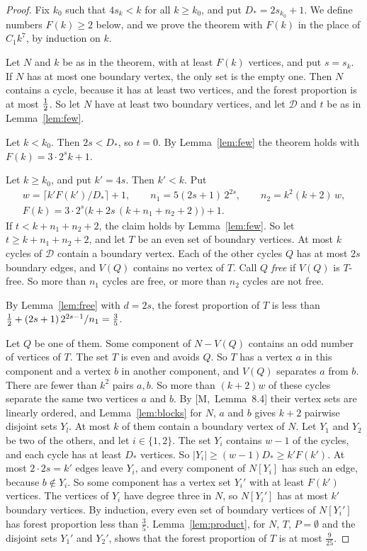 \documentclass[11pt]{article}
\newcommand{\M}[1]{[M,~#1]}
\begin{document}
\begin{proof}
Fix $k_0$ such that $4s_k<k$ for all $k\ge k_0$, and put $D_*=2s_{k_0}+1$. We define numbers
$F(k)\ge2$ below, and we prove the theorem with $F(k)$ in the place of $C_1k^{7}$, by induction
on $k$.

Let $N$ and $k$ be as in the theorem, with at least $F(k)$ vertices, and put $s=s_k$. If $N$ has
at most one boundary vertex, the only set is the empty one. Then $N$ contains a cycle, because it
has at least two vertices, and the forest proportion is at most $\tfrac12$. So let $N$ have at least
two boundary vertices, and let $\mathcal D$ and $t$ be as in Lemma~\ref{lem:few}.

 Let $k<k_0$. Then $2s<D_*$, so $t=0$. By Lemma~\ref{lem:few} the theorem
holds with $F(k)=3\cdot2^{s}k+1$.

 Let $k\ge k_0$, and put $k'=4s$. Then $k'<k$. Put
\begin{gather*}
  w=\lceil k'F(k')/D_*\rceil+1,\qquad n_1=5(2s+1)\,2^{2s},\qquad n_2=k^{2}(k+2)\,w,\\
  F(k)=3\cdot2^{s}\bigl(k+2s\,(k+n_1+n_2+2)\bigr)+1 .
\end{gather*}
If $t<k+n_1+n_2+2$, the claim holds by Lemma~\ref{lem:few}. So let $t\ge k+n_1+n_2+2$, and let
$T$ be an even set of boundary vertices. At most $k$ cycles of $\mathcal D$ contain a boundary
vertex. Each of the other cycles $Q$ has at most $2s$ boundary edges, and $V(Q)$ contains no
vertex of $T$. Call $Q$ \emph{free} if $V(Q)$ is $T$-free. So more than $n_1$ cycles are free, or
more than $n_2$ cycles are not free.

 By Lemma~\ref{lem:free} with $d=2s$, the forest proportion
of $T$ is less than $\tfrac12+(2s+1)\,2^{2s-1}/n_1=\frac35$.

 Let $Q$ be one of them. Some component of
$N-V(Q)$ contains an odd number of vertices of $T$. The set $T$ is even and avoids $Q$. So $T$ has
a vertex $a$ in this component and a vertex $b$ in another component, and $V(Q)$ separates $a$
from $b$. There are fewer than $k^{2}$ pairs $a,b$. So more than $(k+2)w$ of these cycles
separate the same two vertices $a$ and $b$. By \M{Lemma~8.4} their vertex sets are linearly
ordered, and Lemma~\ref{lem:blocks} for $N$, $a$ and $b$ gives $k+2$ pairwise disjoint sets $Y_l$.
At most $k$ of them contain a boundary vertex of $N$. Let $Y_1$ and $Y_2$ be two of the others,
and let $i\in\{1,2\}$. The set $Y_i$ contains $w-1$ of the cycles, and each cycle has at least
$D_*$ vertices. So $|Y_i|\ge(w-1)D_*\ge k'F(k')$. At most $2\cdot2s=k'$ edges leave $Y_i$, and
every component of $N[Y_i]$ has such an edge, because $b\notin Y_i$. So some component has a
vertex set $Y_i'$ with at least $F(k')$ vertices. The vertices of $Y_i$ have degree three in $N$,
so $N[Y_i']$ has at most $k'$ boundary vertices. By induction, every even set of boundary
vertices of $N[Y_i']$ has forest proportion less than $\frac35$. Lemma~\ref{lem:product}, for
$N$, $T$, $P=\emptyset$ and the disjoint sets $Y_1'$ and $Y_2'$, shows that the forest
proportion of $T$ is at most $\frac9{25}$.


\end{proof}
\end{document}
